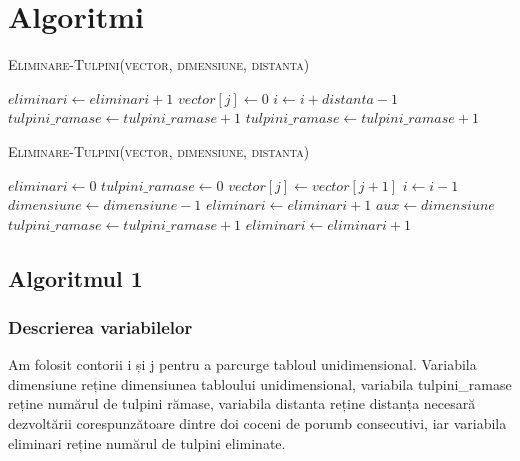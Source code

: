 \documentclass[11pt,a4paper]{article}
\begin{document}
\section{Algoritmi}

\begin{algorithm}
\caption*{\textsc{Eliminare-Tulpini(vector, dimensiune, distanta)}}
\begin{algorithmic}[1]
      \State $eliminari \leftarrow eliminari + 1$
     \EndIf
     \State $vector[j] \leftarrow 0$
    \EndFor
    \State $i \leftarrow i+distanta-1$
    \State $tulpini\_ramase \leftarrow tulpini\_ramase + 1$
  \EndIf
\EndFor
{}
 \State $tulpini\_ramase \leftarrow tulpini\_ramase + 1$
\EndIf
\end{algorithmic}
\end{algorithm}

\begin{algorithm}
\caption*{\textsc{Eliminare-Tulpini(vector, dimensiune, distanta)}}
\begin{algorithmic}[1]
\State $eliminari \leftarrow 0$
\State $tulpini\_ramase \leftarrow 0$
    \State $vector[j] \leftarrow vector[j+1]$
    \EndFor
    \State $i \leftarrow i-1$
    \State $dimensiune \leftarrow dimensiune-1$
    \State $eliminari \leftarrow eliminari+1$
  \EndIf
\EndFor
\State $aux \leftarrow dimensiune$
    \State $tulpini\_ramase \leftarrow tulpini\_ramase+1$
    \State $eliminari \leftarrow eliminari+1$
\EndWhile
\end{algorithmic}
\end{algorithm}

\clearpage

\subsection{Algoritmul 1}
    \subsubsection{\large Descrierea variabilelor}
    Am folosit contorii i și j pentru a parcurge tabloul unidimensional. Variabila dimensiune reține dimensiunea tabloului unidimensional, variabila tulpini\_ramase reține numărul de tulpini rămase, variabila distanta reține distanța necesară dezvoltării corespunzătoare dintre doi coceni de porumb consecutivi, iar variabila eliminari reține numărul de tulpini eliminate.
    
\end{document}
